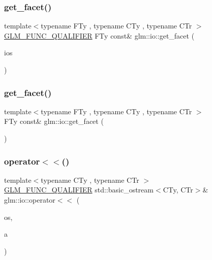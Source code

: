 \subsubsection{\texorpdfstring{get\+\_\+facet()}{get\_facet()}\hspace{0.1cm}{\footnotesize\ttfamily [1/2]}}
{\footnotesize\ttfamily template$<$typename F\+Ty , typename C\+Ty , typename C\+Tr $>$ \\
\hyperlink{setup_8hpp_a33fdea6f91c5f834105f7415e2a64407}{G\+L\+M\+\_\+\+F\+U\+N\+C\+\_\+\+Q\+U\+A\+L\+I\+F\+I\+ER} F\+Ty const\& glm\+::io\+::get\+\_\+facet (\begin{DoxyParamCaption}\item[{std\+::basic\+\_\+ios$<$ C\+Ty, C\+Tr $>$ \&}]{ios }\end{DoxyParamCaption})}

\mbox{\label{namespaceglm_1_1io_a7ae96c71704bbf3c6e61543a7e731bc4}} 
\subsubsection{\texorpdfstring{get\+\_\+facet()}{get\_facet()}\hspace{0.1cm}{\footnotesize\ttfamily [2/2]}}
{\footnotesize\ttfamily template$<$typename F\+Ty , typename C\+Ty , typename C\+Tr $>$ \\
F\+Ty const\& glm\+::io\+::get\+\_\+facet (\begin{DoxyParamCaption}\item[{std\+::basic\+\_\+ios$<$ C\+Ty, C\+Tr $>$ \&}]{ }\end{DoxyParamCaption})}

\mbox{\label{namespaceglm_1_1io_ac52a8c5f8ea189f5bae2e5b8e382675f}} 
\subsubsection{\texorpdfstring{operator$<$$<$()}{operator<<()}\hspace{0.1cm}{\footnotesize\ttfamily [1/8]}}
{\footnotesize\ttfamily template$<$typename C\+Ty , typename C\+Tr $>$ \\
\hyperlink{setup_8hpp_a33fdea6f91c5f834105f7415e2a64407}{G\+L\+M\+\_\+\+F\+U\+N\+C\+\_\+\+Q\+U\+A\+L\+I\+F\+I\+ER} std\+::basic\+\_\+ostream$<$C\+Ty, C\+Tr$>$\& glm\+::io\+::operator$<$$<$ (\begin{DoxyParamCaption}\item[{std\+::basic\+\_\+ostream$<$ C\+Ty, C\+Tr $>$ \&}]{os,  }\item[{\hyperlink{structglm_1_1io_1_1precision}{precision} const \&}]{a }\end{DoxyParamCaption})}

